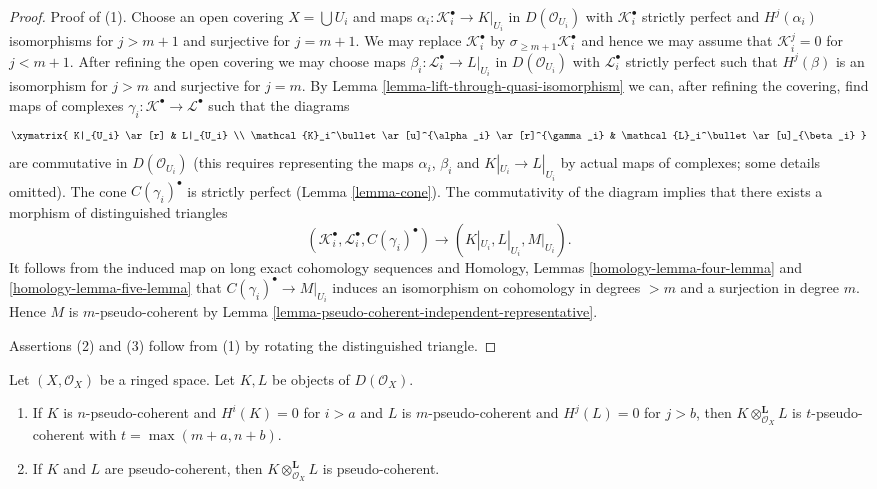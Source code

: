 \begin{proof}
Proof of (1). Choose an open covering $X = \bigcup U_i$ and
maps $\alpha_i : \mathcal{K}_i^\bullet \to K|_{U_i}$ in $D(\mathcal{O}_{U_i})$
with $\mathcal{K}_i^\bullet$ strictly perfect and $H^j(\alpha_i)$
isomorphisms for $j > m + 1$ and surjective for $j = m + 1$.
We may replace $\mathcal{K}_i^\bullet$ by
$\sigma_{\geq m + 1}\mathcal{K}_i^\bullet$
and hence we may assume that $\mathcal{K}_i^j = 0$
for $j < m + 1$. After refining the open covering we may choose
maps $\beta_i : \mathcal{L}_i^\bullet \to L|_{U_i}$ in $D(\mathcal{O}_{U_i})$
with $\mathcal{L}_i^\bullet$ strictly perfect such that
$H^j(\beta)$ is an isomorphism for $j > m$ and
surjective for $j = m$. By
Lemma \ref{lemma-lift-through-quasi-isomorphism}
we can, after refining the covering, find maps of complexes
$\gamma_i : \mathcal{K}^\bullet \to \mathcal{L}^\bullet$
such that the diagrams
$$
\xymatrix{
K|_{U_i} \ar[r] & L|_{U_i} \\
\mathcal{K}_i^\bullet \ar[u]^{\alpha_i} \ar[r]^{\gamma_i} &
\mathcal{L}_i^\bullet \ar[u]_{\beta_i}
}
$$
are commutative in $D(\mathcal{O}_{U_i})$ (this requires representing the
maps $\alpha_i$, $\beta_i$ and $K|_{U_i} \to L|_{U_i}$
by actual maps of complexes; some details omitted).
The cone $C(\gamma_i)^\bullet$ is strictly perfect (Lemma \ref{lemma-cone}).
The commutativity of the diagram implies that there exists a morphism
of distinguished triangles
$$
(\mathcal{K}_i^\bullet, \mathcal{L}_i^\bullet, C(\gamma_i)^\bullet)
\longrightarrow
(K|_{U_i}, L|_{U_i}, M|_{U_i}).
$$
It follows from the induced map on long exact cohomology sequences and
Homology, Lemmas \ref{homology-lemma-four-lemma} and
\ref{homology-lemma-five-lemma}
that $C(\gamma_i)^\bullet \to M|_{U_i}$ induces an isomorphism
on cohomology in degrees $> m$ and a surjection in degree $m$.
Hence $M$ is $m$-pseudo-coherent by
Lemma \ref{lemma-pseudo-coherent-independent-representative}.

\medskip\noindent
Assertions (2) and (3) follow from (1) by rotating the distinguished
triangle.
\end{proof}

\begin{lemma}
\label{lemma-tensor-pseudo-coherent}
Let $(X, \mathcal{O}_X)$ be a ringed space. Let $K, L$ be objects
of $D(\mathcal{O}_X)$.
\begin{enumerate}
\item If $K$ is $n$-pseudo-coherent and $H^i(K) = 0$ for $i > a$
and $L$ is $m$-pseudo-coherent and $H^j(L) = 0$ for $j > b$, then
$K \otimes_{\mathcal{O}_X}^\mathbf{L} L$ is $t$-pseudo-coherent
with $t = \max(m + a, n + b)$.
\item If $K$ and $L$ are pseudo-coherent, then
$K \otimes_{\mathcal{O}_X}^\mathbf{L} L$ is pseudo-coherent.
\end{enumerate}
\end{lemma}

